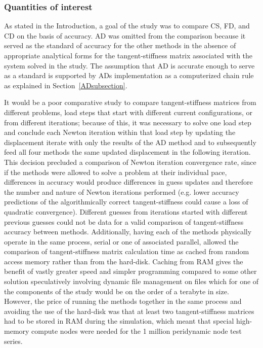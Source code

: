 \documentclass[preprint,12pt]{elsarticle}
\begin{document}
\subsubsection{Quantities of interest} \label{JGAM} 

As stated in the Introduction, a goal of the study was to compare CS, FD, and
CD on the basis of accuracy. AD was omitted from the comparison because it
served as the standard of accuracy for the other methods in the absence of
appropriate analytical forms for the tangent-stiffness matrix associated with
the system solved in the study. The assumption that AD is accurate enough to
serve as a standard is supported by ADs implementation as a computerized chain
rule as explained in Section~\ref{ADsubsection}.

It would be a poor comparative study to compare tangent-stiffness matrices from
different problems, load steps that start with different current
configurations, or from different iterations; because of this, it was necessary
to solve one load step and conclude each Newton iteration within that load step
by updating the displacement iterate with only the results of the AD method and
to subsequently feed all four methods the same updated displacement in the
following iteration. This decision precluded a comparison of Newton iteration
convergence rate, since if the methods were allowed to solve a problem at their
individual pace, differences in accuracy would produce differences in guess
updates and therefore the number and nature of Newton iterations performed
(e.g. lower accuracy predictions of the algorithmically correct
tangent-stiffness could cause a loss of quadratic convergence).  Different
guesses from iterations started with different previous guesses could not be
data for a valid comparison of tangent-stiffness accuracy between methods.
Additionally, having each of the methods physically operate in the same
process, serial or one of associated parallel, allowed the comparison of
tangent-stiffness matrix calculation time as cached from random access memory
rather than from the hard-disk.  Caching from RAM gives the benefit of vastly
greater speed and simpler programming compared to some other solution
speculatively involving dynamic file management on files which for one of the
components of the study would be on the order of a terabyte in size. However,
the price of running the methods together in the same process and avoiding the
use of the hard-disk was that at least two tangent-stiffness matrices had to be
stored in RAM during the simulation, which meant that special high-memory
compute nodes were needed for the 1 million peridynamic node test series.
\end{document}
